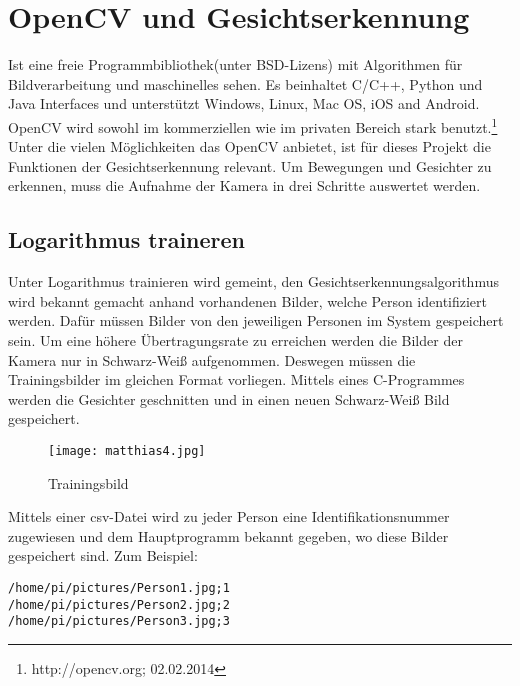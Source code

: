 \section{OpenCV und Gesichtserkennung}

Ist eine freie Programmbibliothek(unter BSD-Lizens) mit Algorithmen für Bildverarbeitung und maschinelles sehen. Es beinhaltet C/C++, Python und Java Interfaces und unterstützt Windows, Linux, Mac OS, iOS and Android. OpenCV wird sowohl im kommerziellen wie im privaten Bereich stark benutzt.\footnote{http://opencv.org; 02.02.2014}\\

Unter die vielen Möglichkeiten das OpenCV anbietet, ist für dieses Projekt die Funktionen der Gesichtserkennung relevant. Um Bewegungen und Gesichter zu erkennen, muss die Aufnahme der Kamera in drei Schritte auswertet werden. 


\subsection{Logarithmus traineren}
Unter Logarithmus trainieren wird gemeint, den Gesichtserkennungsalgorithmus wird bekannt gemacht anhand vorhandenen Bilder, welche Person identifiziert werden. Dafür müssen Bilder von den jeweiligen Personen im System gespeichert sein. Um eine höhere Übertragungsrate zu erreichen werden die Bilder der Kamera nur in Schwarz-Weiß aufgenommen. Deswegen müssen die Trainingsbilder im gleichen Format vorliegen. Mittels eines C-Programmes werden die Gesichter geschnitten und in einen neuen Schwarz-Weiß Bild gespeichert.\\

\begin{figure}[h]
  \begin{center}		%
    \texttt{[image: matthias4.jpg]}
  		  \caption{Trainingsbild}
     \label{Trainingsbild}
  \end{center}
\end{figure}

\newpage
Mittels einer csv-Datei wird zu jeder Person eine Identifikationsnummer zugewiesen und dem Hauptprogramm bekannt gegeben, wo diese Bilder gespeichert sind. Zum Beispiel:\\

\begin{lstlisting}
/home/pi/pictures/Person1.jpg;1
/home/pi/pictures/Person2.jpg;2
/home/pi/pictures/Person3.jpg;3
\end{lstlisting}


